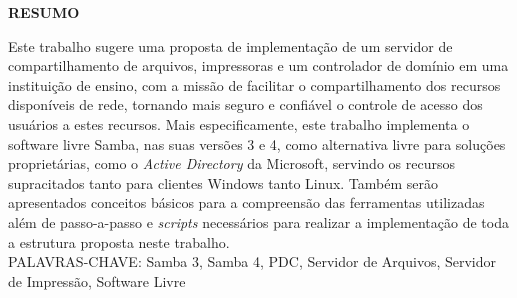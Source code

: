 \begin{center}
\textbf{RESUMO}
\end{center}
\singlespacing

\noindent Este trabalho sugere uma proposta de implementação de um servidor de compartilhamento de arquivos, impressoras e um controlador de domínio em uma instituição de ensino, com a missão de facilitar o compartilhamento dos recursos disponíveis de rede, tornando mais seguro e confiável o controle de acesso dos usuários a estes recursos. Mais especificamente, este trabalho implementa o software livre Samba, nas suas versões 3 e 4, como alternativa livre para soluções proprietárias, como o \textit{Active Directory} da Microsoft, servindo os recursos supracitados tanto para clientes Windows tanto Linux. Também serão apresentados conceitos básicos para a compreensão das ferramentas utilizadas além de passo-a-passo e \textit{scripts} necessários para realizar a implementação de toda a estrutura proposta neste trabalho. \\

\noindent PALAVRAS-CHAVE: Samba 3, Samba 4, PDC, Servidor de Arquivos, Servidor de Impressão, Software Livre
